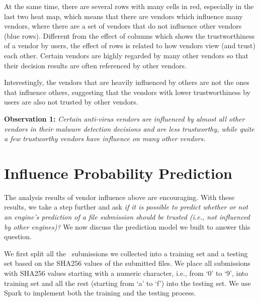 At the same time, there are several rows with many cells in red, especially in the last two heat map, 
which means that there are vendors which influence many vendors,
where there are a set of vendors that do not influence other vendors (blue rows).
Different from the effect of columns which shows the trustworthiness of a vendor by users, 
the effect of rows is related to how vendors view (and trust) each other. 
Certain vendors are highly regarded by many other vendors so that 
their decision results are often referenced by other vendors.

Interestingly, the vendors that are heavily influenced by others are not the ones that influence others, 
suggesting that the vendors with lower trustworthiness by users are also not trusted by other vendors. 




{\bf Observation 1:} 
{\em Certain anti-virus vendors are influenced by almost all other vendors in their malware detection decisions and are less trustworthy, 
while quite a few trustworthy vendors have influence on many other vendors.}

\vspace{-0.05in}
\section{Influence Probability Prediction}
\label{sec:predict}

The analysis results of vendor influence above are encouraging.
With these results, we take a step further and ask 
{\em if it is possible to predict whether or not an engine's prediction of 
a file submission should be trusted (i.e., not influenced by other engines)?}
We now discuss the prediction model we built to answer this question.

We first split all the \pe\ submissions we collected into a training set and a testing set based on 
the SHA256 values of the submitted files. 
We place all submissions with SHA256 values starting with a numeric character, 
i.e., from `0' to `9', into training set
and all the rest (starting from `a' to `f') into the testing set.
We use Spark to implement both the training and the testing process.


